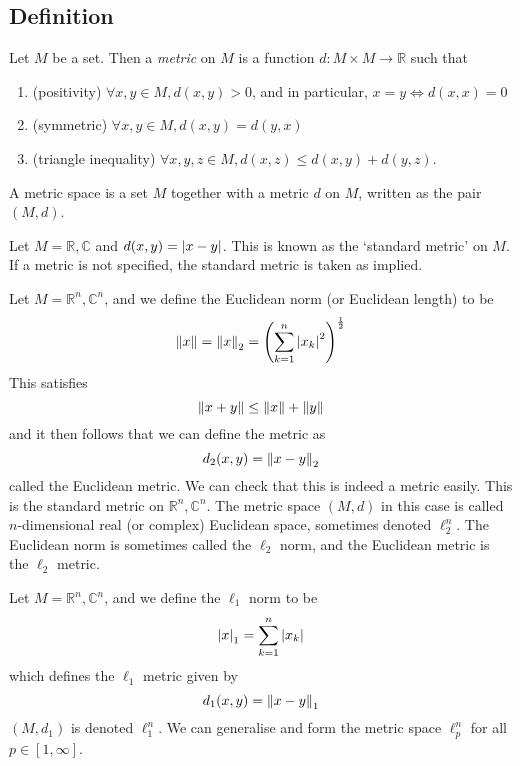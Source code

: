 \subsection{Definition}
\begin{definition}
	Let \( M \) be a set.
	Then a \textit{metric} on \( M \) is a function \( d \colon M \times M \to \mathbb R \) such that
	\begin{enumerate}
		\item (positivity) \( \forall x,y \in M, d(x,y) > 0 \), and in particular, \( x = y \iff d(x,x) = 0 \)
		\item (symmetric) \( \forall x,y \in M, d(x,y) = d(y,x) \)
		\item (triangle inequality) \( \forall x,y,z \in M, d(x,z) \leq d(x,y) + d(y,z) \).
	\end{enumerate}
	A metric space is a set \( M \) together with a metric \( d \) on \( M \), written as the pair \( (M, d) \).
\end{definition}
\begin{example}
	Let \( M = \mathbb R, \mathbb C \) and \( d(x,y) = \abs{x-y} \).
	This is known as the `standard metric' on \( M \).
	If a metric is not specified, the standard metric is taken as implied.
\end{example}
\begin{example}
	Let \( M = \mathbb R^n, \mathbb C^n \), and we define the Euclidean norm (or Euclidean length) to be
	\[
		\norm{x} = \norm{x}_2 = \qty(\sum_{k=1}^n \abs{x_k}^2)^{\frac{1}{2}}
	\]
	This satisfies
	\[
		\norm{x+y} \leq \norm{x} + \norm{y}
	\]
	and it then follows that we can define the metric as
	\[
		d_2(x,y) = \norm{x-y}_2
	\]
	called the Euclidean metric.
	We can check that this is indeed a metric easily.
	This is the standard metric on \( \mathbb R^n, \mathbb C^n \).
	The metric space \( (M, d) \) in this case is called \( n \)-dimensional real (or complex) Euclidean space, sometimes denoted \( \ell_2^n \).
	The Euclidean norm is sometimes called the \( \ell_2 \) norm, and the Euclidean metric is the \( \ell_2 \) metric.
\end{example}
\begin{example}
	Let \( M = \mathbb R^n, \mathbb C^n \), and we define the \( \ell_1 \) norm to be
	\[
		\abs{x}_1 = \sum_{k=1}^n \abs{x_k}
	\]
	which defines the \( \ell_1 \) metric given by
	\[
		d_1(x,y) = \norm{x-y}_1
	\]
	\( (M, d_1) \) is denoted \( \ell_1^n \).
	We can generalise and form the metric space \( \ell_p^n \) for all \( p \in [1, \infty] \).
\end{example}
